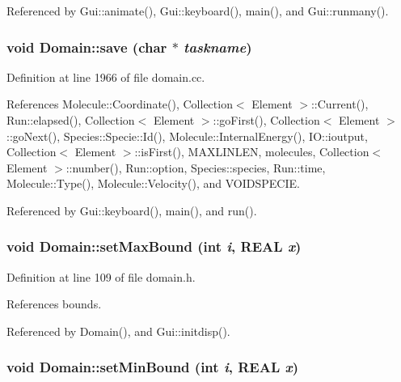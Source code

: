 Referenced by Gui::animate(), Gui::keyboard(), main(), and Gui::runmany().\hypertarget{classDomain_e4ca51adef8bfebfa79963a486380749}{
\subsubsection[{save}]{\setlength{\rightskip}{0pt plus 5cm}void Domain::save (char $\ast$ {\em taskname})}}
\label{classDomain_e4ca51adef8bfebfa79963a486380749}




Definition at line 1966 of file domain.cc.

References Molecule::Coordinate(), Collection$<$ Element $>$::Current(), Run::elapsed(), Collection$<$ Element $>$::goFirst(), Collection$<$ Element $>$::goNext(), Species::Specie::Id(), Molecule::InternalEnergy(), IO::ioutput, Collection$<$ Element $>$::isFirst(), MAXLINLEN, molecules, Collection$<$ Element $>$::number(), Run::option, Species::species, Run::time, Molecule::Type(), Molecule::Velocity(), and VOIDSPECIE.

Referenced by Gui::keyboard(), main(), and run().\hypertarget{classDomain_dc09d059d5102a38d70714d894be49f0}{
\subsubsection[{setMaxBound}]{\setlength{\rightskip}{0pt plus 5cm}void Domain::setMaxBound (int {\em i}, \/  REAL {\em x})}}
\label{classDomain_dc09d059d5102a38d70714d894be49f0}




Definition at line 109 of file domain.h.

References bounds.

Referenced by Domain(), and Gui::initdisp().\hypertarget{classDomain_7d1404792c54b3832a48561bac4996a3}{
\subsubsection[{setMinBound}]{\setlength{\rightskip}{0pt plus 5cm}void Domain::setMinBound (int {\em i}, \/  REAL {\em x})}}
\label{classDomain_7d1404792c54b3832a48561bac4996a3}




